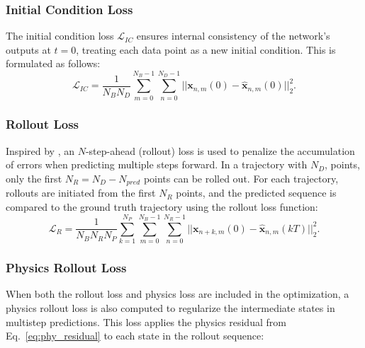 \subsubsection{Initial Condition Loss}
The initial condition loss $\mathcal{L}_{IC}$ ensures internal consistency of the network’s outputs at $t=0$, treating each data point as a new initial condition. This is formulated as follows:
\begin{equation}
    \mathcal{L}_{IC} = \frac{1}{N_B N_D} \sum^{N_B-1}_{m=0}\sum^{N_D-1}_{n=0}||\mathbf{x}_{n,m}(0)-\hat{\mathbf{x}}_{n,m}(0)||_2^2.
\end{equation}

\subsubsection{Rollout Loss}
Inspired by \cite{zhao_research_2024}, an $N$-step-ahead (rollout) loss is used to penalize the accumulation of errors when predicting multiple steps forward. In a trajectory with $N_D$, points, only the first $N_R=N_D-N_{pred}$ points can be rolled out. For each trajectory, rollouts are initiated from the first $N_R$ points, and the predicted sequence is compared to the ground truth trajectory using the rollout loss function:
\begin{equation}
    \mathcal{L}_R = \frac{1}{{N_B N_R N_P}} \sum^{N_P}_{k=1} \sum^{N_B-1}_{m=0} \sum^{N_R-1}_{n=0} ||\mathbf{x}_{n+k,m}(0) - \hat{\mathbf{x}}_{n,m}(kT)||_2^2.
\end{equation}

\subsubsection{Physics Rollout Loss}
When both the rollout loss and physics loss are included in the optimization, a physics rollout loss is also computed to regularize the intermediate states in multistep predictions. This loss applies the physics residual from Eq.~\eqref{eq:phy_residual} to each state in the rollout sequence:

